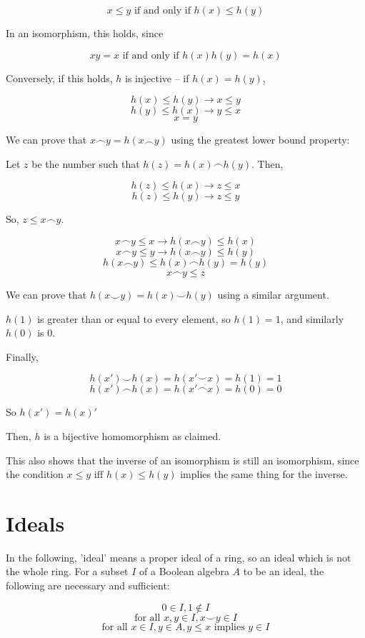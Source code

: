 \documentclass{article}
\begin{document}
    \[x \leq y \text{ if and only if } h(x) \leq h(y) \]

    In an isomorphism, this holds, since

    \[xy = x \text{ if and only if } h(x)h(y) = h(x)\]

    Conversely, if this holds, $h$ is injective -- if $h(x) = h(y)$,

    \[h(x) \leq h(y) \rightarrow x \leq y\]
    \[h(y) \leq h(x) \rightarrow y \leq x\]
    \[x = y\]

    We can prove that $x \frown y = h(x \frown y)$ using the greatest lower
    bound property:

    Let $z$ be the number such that $h(z) = h(x) \frown h(y)$. Then,

    \[h(z) \leq h(x) \rightarrow z \leq x\]
    \[h(z) \leq h(y) \rightarrow z \leq y\]

    So, $z \leq x \frown y$.

    \[x \frown y \leq x \rightarrow h(x \frown y) \leq h(x)\]
    \[x \frown y \leq y \rightarrow h(x \frown y) \leq h(y)\]
    \[h(x \frown y) \leq h(x) \frown h(y) = h(y)\]
    \[x \frown y \leq z\]

    We can prove that $h(x \smile y) = h(x) \smile h(y)$ using a similar
    argument.

    $h(1)$ is greater than or equal to every element, so $h(1) = 1$, and
    similarly $h(0)$ is $0$.

    Finally,

    \[h(x') \smile h(x) = h(x' \smile x) = h(1) = 1\]
    \[h(x') \frown h(x) = h(x' \frown x) = h(0) = 0\]

    So $h(x') = h(x)'$

    Then, $h$ is a bijective homomorphism as claimed.

    This also shows that the inverse of an isomorphism is still an isomorphism,
    since the condition $x \leq y \text{ iff } h(x) \leq h(y)$ implies the same
    thing for the inverse.

    \section{Ideals}

      In the following, 'ideal' means a proper ideal of a ring, so an ideal
      which is not the whole ring. For a subset $I$ of a Boolean algebra $A$ to
      be an ideal, the following are necessary and sufficient:

      \[0 \in I, 1 \notin I\]
      \[\text{for all } x, y \in I, x \smile y \in I\]
      \[\text{for all } x \in I, y \in A, y \leq x \text{ implies } y \in I\]
\end{document}
